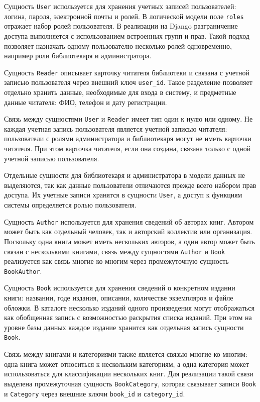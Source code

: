 Сущность \texttt{User} используется для хранения учетных записей пользователей:
логина, пароля, электронной почты и ролей. В логической модели поле
\texttt{roles} отражает набор ролей пользователя. В реализации на Django
разграничение доступа выполняется с использованием встроенных групп и прав.
Такой подход позволяет назначать одному пользователю несколько ролей
одновременно, например роли библиотекаря и администратора.

Сущность \texttt{Reader} описывает карточку читателя библиотеки и связана с
учетной записью пользователя через внешний ключ \texttt{user\_id}. Такое
разделение позволяет отдельно хранить данные, необходимые для входа в систему, и
предметные данные читателя: ФИО, телефон и дату регистрации.

Связь между сущностями \texttt{User} и \texttt{Reader} имеет тип один к нулю или
одному. Не каждая учетная запись пользователя является учетной записью читателя:
пользователи с ролями администратора и библиотекаря могут не иметь карточки
читателя. При этом карточка читателя, если она создана, связана только с одной
учетной записью пользователя.

Отдельные сущности для библиотекаря и администратора в модели данных не
выделяются, так как данные пользователи отличаются прежде всего набором прав
доступа. Их учетные записи хранятся в сущности \texttt{User}, а доступ к функциям
системы определяется ролью пользователя.

Сущность \texttt{Author} используется для хранения сведений об авторах книг.
Автором может быть как отдельный человек, так и авторский коллектив или
организация. Поскольку одна книга может иметь нескольких авторов, а один автор
может быть связан с несколькими книгами, связь между сущностями \texttt{Author}
и \texttt{Book} реализуется как связь многие ко многим через промежуточную
сущность \texttt{BookAuthor}.

Сущность \texttt{Book} используется для хранения сведений о конкретном издании
книги: названии, годе издания, описании, количестве экземпляров и файле обложки.
В каталоге несколько изданий одного произведения могут отображаться как
обобщенная запись с возможностью раскрытия списка изданий. При этом на уровне
базы данных каждое издание хранится как отдельная запись сущности \texttt{Book}.

Связь между книгами и категориями также является связью многие ко многим: одна
книга может относиться к нескольким категориям, а одна категория может
использоваться для классификации нескольких книг. Для реализации такой связи
выделена промежуточная сущность \texttt{BookCategory}, которая связывает записи
\texttt{Book} и \texttt{Category} через внешние ключи \texttt{book\_id} и
\texttt{category\_id}.

